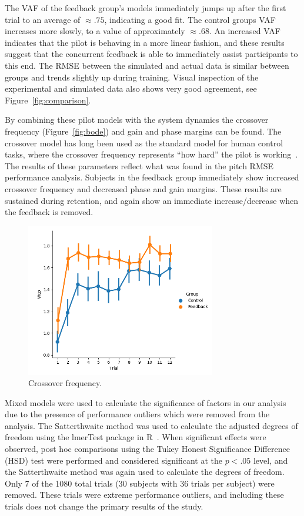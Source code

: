 The VAF of the feedback group's models immediately jumps up after the first trial to an average of $\approx.75$, indicating a good fit.
The control groups VAF increases more slowly, to a value of approximately $\approx.68$.
An increased VAF indicates that the pilot is behaving in a more linear fashion, and these results suggest that the concurrent feedback is able to immediately assist participants to this end.
The RMSE between the simulated and actual data is similar between groups and trends slightly up during training.
Visual inspection of the experimental and simulated data also shows very good agreement, see Figure~\ref{fig:comparison}.

By combining these pilot models with the system dynamics the crossover frequency (Figure~\ref{fig:bode}) and gain and phase margins can be found.
The crossover model has long been used as the standard model for human control tasks, where the crossover frequency represents ``how hard'' the pilot is working~\cite{mcruer_dynamic_1957}.
The results of these parameters reflect what was found in the pitch RMSE performance analysis.
Subjects in the feedback group immediately show increased crossover frequency and decreased phase and gain margins.
These results are sustained during retention, and again show an immediate increase/decrease when the feedback is removed.

\begin{figure}
    \centering
    \includegraphics[width=3.25in]{figures/model_Wcp.png}
    \caption{Crossover frequency.}
    \label{fig:crossover}
\end{figure}

Mixed models were used to calculate the significance of factors in our analysis due to the presence of performance outliers which were removed from the analysis.
The Satterthwaite method was used to calculate the adjusted degrees of freedom using the lmerTest package in R~\cite{RN53}.
When significant effects were observed, post hoc comparisons using the Tukey Honest Significance Difference (HSD) test were performed and considered significant at the $p < .05$ level, and the Satterthwaite method was again used to calculate the degrees of freedom.
Only 7 of the 1080 total trials (30 subjects with 36 trials per subject) were removed.
These trials were extreme performance outliers, and including these trials does not change the primary results of the study.

